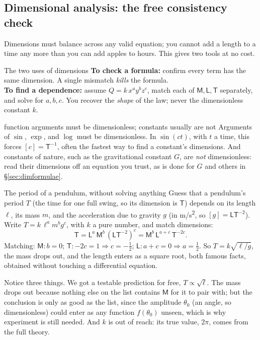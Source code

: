 \subsection{Dimensional analysis: the free consistency check}

Dimensions must balance across any valid equation; you cannot add a length to a time any more than
you can add apples to hours. This gives two tools at no cost.

\begin{methodbox}{The two uses of dimensions}
\textbf{To check a formula:} confirm every term has the same dimension. A single mismatch \emph{kills}
the formula. \\[3pt]
\textbf{To find a dependence:} assume $Q=k\,x^a y^b z^c$, match each of $\mathsf{M},\mathsf{L},\mathsf{T}$
separately, and solve for $a,b,c$. You recover the \emph{shape} of the law; never the dimensionless
constant $k$.
\end{methodbox}

\begin{trapbox}{function arguments must be dimensionless; constants usually are not}
Arguments of $\sin$, $\exp$, and $\log$ must be dimensionless. In $\sin(ct)$, with $t$ a time, this forces
$[c]=\mathsf{T}^{-1}$, often the fastest way to find a constant's dimensions. And constants of nature, such as
the gravitational constant $G$, are \emph{not} dimensionless: read their dimensions off an equation you
trust, as is done for $G$ and others in \S\ref{sec:dimformulae}.
\end{trapbox}

\begin{exbox}{The period of a pendulum, without solving anything}
Guess that a pendulum's period $T$ (the time for one full swing, so its dimension is $\mathsf{T}$)
depends on its length $\ell$, its mass $m$, and the acceleration due to gravity $g$ (in \si{m/s^2}, so
$[g]=\mathsf{LT^{-2}}$). Write $T=k\,\ell^a m^b g^c$, with $k$ a pure number, and match dimensions:
\[
\mathsf{T}=\mathsf{L}^a\,\mathsf{M}^b\,(\mathsf{L}\mathsf{T}^{-2})^c
=\mathsf{M}^b\,\mathsf{L}^{a+c}\,\mathsf{T}^{-2c}.
\]
Matching: $\mathsf{M}: b=0$; $\mathsf{T}: -2c=1\Rightarrow c=-\tfrac12$; $\mathsf{L}: a+c=0\Rightarrow
a=\tfrac12$. So $T=k\sqrt{\ell/g}$, the mass drops out, and the length enters as a square root, both
famous facts, obtained without touching a differential equation. 

\smallskip
Notice three things. We got a testable prediction for free, $T\propto\sqrt\ell$. The mass drops out
because nothing else on the list contains $\mathsf{M}$ for it to pair with; but the conclusion is only as
good as the list, since the amplitude $\theta_0$ (an angle, so dimensionless) could enter as any function
$f(\theta_0)$ unseen, which is why experiment is still needed. And $k$ is out of reach: its true value,
$2\pi$, comes from the full theory.
\end{exbox}

